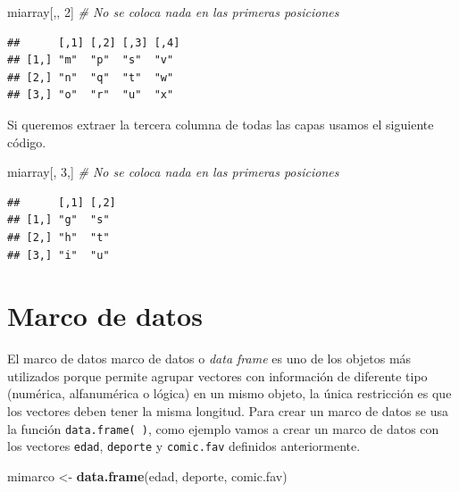 \documentclass[10pt,]{krantz}
\makeatletter
\newenvironment{Shaded}{\begin{snugshade}}{\end{snugshade}}
\newcommand{\KeywordTok}[1]{\textcolor[rgb]{0.13,0.29,0.53}{\textbf{{#1}}}}
\newcommand{\DecValTok}[1]{\textcolor[rgb]{0.00,0.00,0.81}{{#1}}}
\newcommand{\StringTok}[1]{\textcolor[rgb]{0.31,0.60,0.02}{{#1}}}
\newcommand{\CommentTok}[1]{\textcolor[rgb]{0.56,0.35,0.01}{\textit{{#1}}}}
\newcommand{\NormalTok}[1]{{#1}}
\newenvironment{kframe}{%
\medskip{}
\setlength{\fboxsep}{.8em}
 \def\at@end@of@kframe{}%
 \ifinner\ifhmode%
  \def\at@end@of@kframe{\end{minipage}}%
  \begin{minipage}{\columnwidth}%
 \fi\fi%
 \def\FrameCommand##1{\hskip\@totalleftmargin \hskip-\fboxsep
 \colorbox{shadecolor}{##1}\hskip-\fboxsep
     \hskip-\linewidth \hskip-\@totalleftmargin \hskip\columnwidth}%
 \MakeFramed {\advance\hsize-\width
   \@totalleftmargin\z@ \linewidth\hsize
   \@setminipage}}%
 {\par\unskip\endMakeFramed%
 \at@end@of@kframe}
\renewenvironment{Shaded}{\begin{kframe}}{\end{kframe}}
\makeatother
\begin{document}
\begin{Shaded}
\begin{Highlighting}[]
\NormalTok{miarray[,, }\DecValTok{2}\NormalTok{]  }\CommentTok{# No se coloca nada en las primeras posiciones}
\end{Highlighting}
\end{Shaded}

\begin{verbatim}
##      [,1] [,2] [,3] [,4]
## [1,] "m"  "p"  "s"  "v" 
## [2,] "n"  "q"  "t"  "w" 
## [3,] "o"  "r"  "u"  "x"
\end{verbatim}

Si queremos extraer la tercera columna de todas las capas usamos el
siguiente código.

\begin{Shaded}
\begin{Highlighting}[]
\NormalTok{miarray[, }\DecValTok{3}\NormalTok{,]  }\CommentTok{# No se coloca nada en las primeras posiciones}
\end{Highlighting}
\end{Shaded}

\begin{verbatim}
##      [,1] [,2]
## [1,] "g"  "s" 
## [2,] "h"  "t" 
## [3,] "i"  "u"
\end{verbatim}

\section{\texorpdfstring{Marco de datos 
 \label{marcodatos}
\label{marcodatos}}{Marco de datos    }}\label{marco-de-datos}

El marco de datos marco de datos o \emph{data frame} es uno de los
objetos más utilizados porque permite agrupar vectores con información
de diferente tipo (numérica, alfanumérica o lógica) en un mismo objeto,
la única restricción es que los vectores deben tener la misma longitud.
Para crear un marco de datos se usa la función \texttt{data.frame(\ )},
como ejemplo vamos a crear un marco de datos con los vectores
\texttt{edad}, \texttt{deporte} y \texttt{comic.fav} definidos
anteriormente.

\begin{Shaded}
\begin{Highlighting}[]
\NormalTok{mimarco <-}\StringTok{ }\KeywordTok{data.frame}\NormalTok{(edad, deporte, comic.fav)}
\end{Highlighting}
\end{Shaded}
\end{document}
